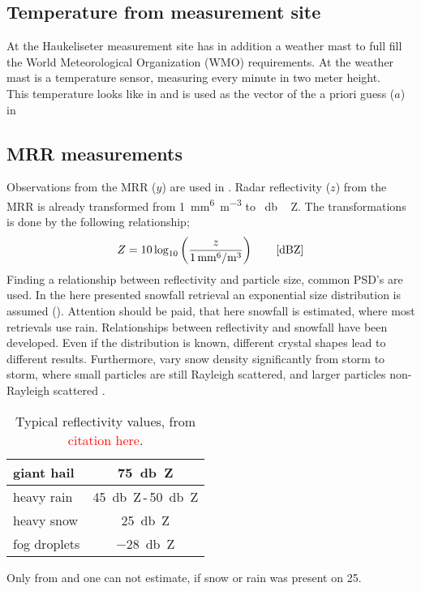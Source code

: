 \subsection*{Temperature from measurement site}

At the Haukeliseter measurement site has in addition a weather mast to full fill the World Meteorological Organization (WMO) requirements. At the weather mast is a temperature sensor, measuring every minute in two meter height. \\
This temperature looks like in  and is used as the vector of the a priori guess ($a$) in 

\subsection*{MRR measurements}

Observations from the MRR ($y$) are used in .
Radar reflectivity ($z$) from the MRR is already transformed from \SI{1}{\mm^6\per\metre^3} to \SI{}{\decibel\,Z}.
The transformations is done by the following relationship;
\begin{equation}
Z = 10 \log_{10} \left(\frac{z}{\SI{1}{\mm^6\per\metre^3}}\right) \qquad \text{[\SI{}{\decibel Z}]} 
\end{equation}
Finding a relationship between reflectivity and particle size, common PSD's are used. In the here presented snowfall retrieval an exponential size distribution is assumed (). Attention should be paid, that here snowfall is estimated, where most retrievals use rain. Relationships between reflectivity and snowfall have been developed. Even if the distribution is known, different crystal shapes lead to different results. Furthermore, vary snow density significantly from storm to storm, where small particles are still Rayleigh scattered, and larger particles non-Rayleigh scattered \citep{gunn_microwave_1954}. 
\begin{table}[H]
	\begin{center}
		\caption{Typical reflectivity values, from \cite{} \textcolor{red}{citation here}. }\label{tab:ref_values}
		\begin{tabular}{l|c}
			\hline \hline
			giant hail & \SI{75}{\decibel Z} \\ \hline
			heavy rain & \SI{45}{\decibel Z}\,-\,\SI{50}{\decibel Z} \\ \hline
			heavy snow & \SI{25}{\decibel Z}  \\ \hline
			fog droplets & \SI{-28}{\decibel Z}\\
			\hline
		\end{tabular}
	\end{center}
\end{table}
Only from  and  one can not estimate, if snow or rain was present on \SI{25}{\dec}.





